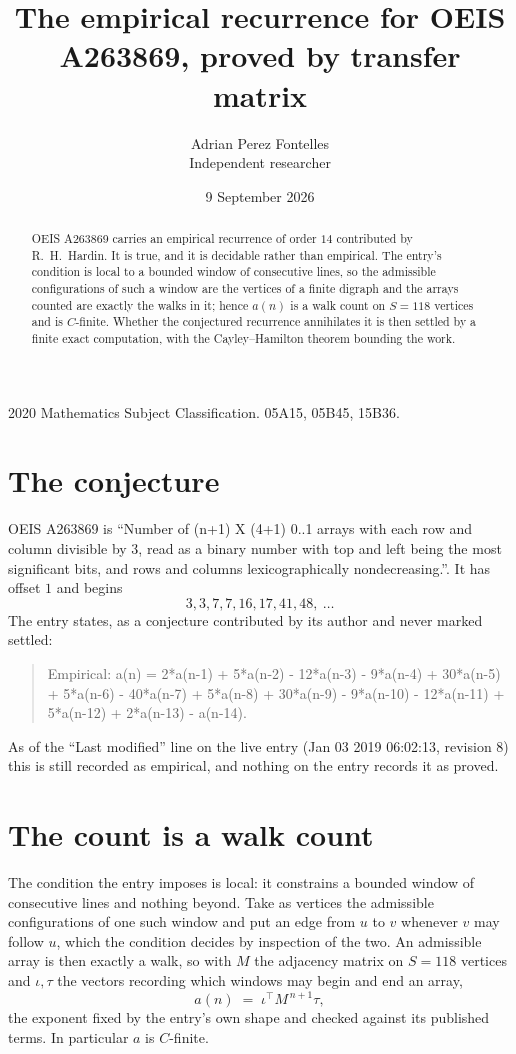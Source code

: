 \documentclass[11pt,a4paper]{article}
\title{The empirical recurrence for OEIS A263869, proved by transfer matrix}
\author{Adrian Perez Fontelles\\ \small Independent researcher}
\date{9 September 2026}
\theoremstyle{plain}
\theoremstyle{definition}
\begin{document}
\maketitle

\begin{abstract}
OEIS A263869 carries an empirical recurrence of order $14$ contributed by R.~H.~Hardin. It is
true, and it is decidable rather than empirical. The entry's condition is local to a bounded window of consecutive lines, so
the admissible configurations of such a window are the vertices of a finite digraph and the
arrays counted are exactly the walks in it; hence $a(n)$ is a walk count on $S=118$ vertices
and is $C$-finite. Whether the conjectured recurrence annihilates it is then settled by a
finite exact computation, with the Cayley--Hamilton theorem bounding the work.
\end{abstract}

\noindent\small 2020 Mathematics Subject Classification. 05A15, 05B45, 15B36.\normalsize

\section{The conjecture}

OEIS A263869 is ``Number of (n+1) X (4+1) 0..1 arrays with each row and column divisible by 3, read as a binary number with top and left being the most significant bits, and rows and columns lexicographically nondecreasing.''. It has offset $1$ and begins
\[
3, 3, 7, 7, 16, 17, 41, 48,\ \dots
\]
The entry states, as a conjecture contributed by its author and never marked settled:
\begin{quote}
Empirical: a(n) = 2*a(n-1) + 5*a(n-2) - 12*a(n-3) - 9*a(n-4) + 30*a(n-5) + 5*a(n-6) - 40*a(n-7) + 5*a(n-8) + 30*a(n-9) - 9*a(n-10) - 12*a(n-11) + 5*a(n-12) + 2*a(n-13) - a(n-14).
\end{quote}
As of the ``Last modified'' line on the live entry (Jan 03 2019 06:02:13, revision 8) this is still
recorded as empirical, and nothing on the entry records it as proved.

\section{The count is a walk count}

The condition the entry imposes is local: it constrains a bounded window of consecutive lines and nothing beyond. Take as
vertices the admissible configurations of one such window and put an edge from $u$ to $v$
whenever $v$ may follow $u$, which the condition decides by inspection of the two. An
admissible array is then exactly a walk, so with $M$ the adjacency matrix on $S=118$ vertices
and $\iota,\tau$ the vectors recording which windows may begin and end an array,
\[
a(n)\;=\;\iota^{\!\top}M^{\,n+1}\tau ,
\]
the exponent fixed by the entry's own shape and checked against its published terms. In
particular $a$ is $C$-finite.
\end{document}
